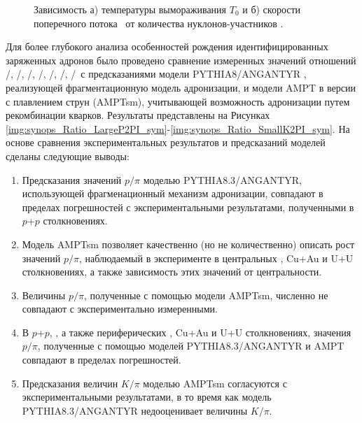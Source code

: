 \begin{figure}[ht]
	\caption{Зависимость а) температуры вымораживания $T_0$ и  б) скорости поперечного потока \ut \ от количества нуклонов-участников \Npart.}\label{fig:synops_T0ut}
\end{figure}
Для более глубокого анализа особенностей рождения идентифицированных заряженных адронов было проведено сравнение измеренных значений отношений  \pim/\pip, \Km/\Kp, \prot/\aprot, \prot/\pip, \aprot/\pim, \Kp/\pip, \Km/\pim \ с предсказаниями модели PYTHIA8/ANGANTYR \cite{pythia}, реализующей фрагментационную модель адронизации, и модели AMPT в версии с плавлением струн (AMPTsm)\cite{AMPT}, учитывающей возможность адронизации путем рекомбинации кварков. 
Результаты представлены на Рисунках \ref{img:synops_Ratio_LargeP2PI_sym}-\ref{img:synops_Ratio_SmallK2PI_sym}.
На основе сравнения экспериментальных результатов и предсказаний моделей сделаны следующие выводы:

\begin{enumerate}
	\item Предсказания значений $p/\pi$ моделью PYTHIA8.3/ANGANTYR, использующей фрагменационный механизм адронизации, совпадают в пределах погрешностей с экспериментальными результатами, полученными в $p$+$p$ столкновениях. 
	\item Модель AMPTsm позволяет качественно (но не количественно) описать рост значений $p/\pi$, наблюдаемый в эксперименте в центральных \heau, Cu+Au и U+U столкновениях, а также зависимость этих значений от центральности. 
	\item Величины $p/\pi$, полученные с помощью модели AMPTsm, численно не совпадают с экспериментально измеренными. 
	\item В $p$+$p$, \pal, а также периферических \heau, Cu+Au и U+U столкновениях, значения $p/\pi$, полученные с помощью моделей PYTHIA8.3/ANGANTYR и AMPT совпадают в пределах погрешностей.
	\item Предсказания величин $K/\pi$ моделью AMPTsm согласуются с экспериментальными результатами, в то время как модель PYTHIA8.3/ANGANTYR недооценивает величины $K/\pi$.
\end{enumerate}

